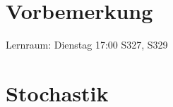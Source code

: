 \newcommand{\customDir}{../}








\renewenvironment{anumerate}{\begin{enumerate}[label=(\alph*)]}{\end{enumerate}} %


%


\maketitle
\newpage
\tableofcontents
\newpage

\chapter*{Vorbemerkung}
Lernraum: Dienstag 17:00 S327, S329

\chapter*{Stochastik}

